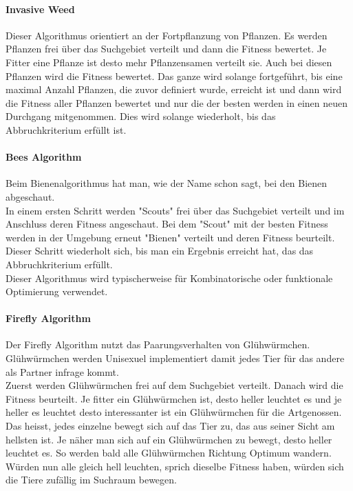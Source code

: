 		\paragraph{Invasive Weed}
		$\;$ \\
		Dieser Algorithmus orientiert an der Fortpflanzung von Pflanzen. Es werden Pflanzen frei über das Suchgebiet verteilt und dann die Fitness bewertet. Je Fitter eine Pflanze ist desto mehr Pflanzensamen verteilt sie. Auch bei diesen Pflanzen wird die Fitness bewertet. Das ganze wird solange fortgeführt, bis eine maximal Anzahl Pflanzen, die zuvor definiert wurde, erreicht ist und dann wird die Fitness aller Pflanzen bewertet und nur die der besten werden in einen neuen Durchgang mitgenommen. Dies wird solange wiederholt, bis das Abbruchkriterium erfüllt ist.
				
		
		\paragraph{Bees Algorithm}
		$\;$ \\
		Beim Bienenalgorithmus hat man, wie der Name schon sagt, bei den Bienen abgeschaut.\\
		In einem ersten Schritt werden "Scouts" frei über das Suchgebiet verteilt und im Anschluss deren Fitness angeschaut. Bei dem "Scout" mit der besten Fitness werden in der Umgebung erneut "Bienen" verteilt und deren Fitness beurteilt. Dieser Schritt wiederholt sich, bis man ein Ergebnis erreicht hat, das das Abbruchkriterium erfüllt.\\Dieser Algorithmus wird typischerweise für Kombinatorische oder funktionale Optimierung verwendet.
		
		\paragraph{Firefly Algorithm} 
		Der Firefly Algorithm nutzt das Paarungsverhalten von Glühwürmchen. Glühwürmchen werden Unisexuel implementiert damit jedes Tier für das andere als Partner infrage kommt. \\
		Zuerst werden Glühwürmchen frei auf dem Suchgebiet verteilt. Danach wird die Fitness beurteilt. Je fitter ein Glühwürmchen ist, desto heller leuchtet es und je heller es leuchtet desto interessanter ist ein Glühwürmchen für die Artgenossen. Das heisst, jedes einzelne bewegt sich auf das Tier zu, das aus seiner Sicht am hellsten ist. Je näher man sich auf ein Glühwürmchen zu bewegt, desto heller leuchtet es. So werden bald alle Glühwürmchen Richtung Optimum wandern. Würden nun alle gleich hell leuchten, sprich dieselbe Fitness haben, würden sich die Tiere zufällig im Suchraum bewegen.
		
		